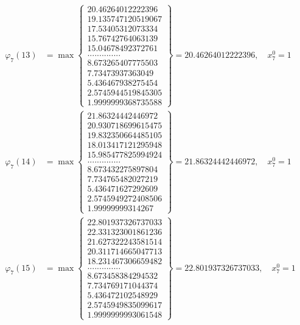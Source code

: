 \documentclass{article}
\begin{document}
\begin{align*}
  
  
  
\varphi_{7}(13) &= \max \left\{ \begin{array}{c}
20.46264012222396 \\
 19.135747120519067 \\
 17.53405312073334 \\
 15.76742764063139 \\
 15.04678492372761 \\
 .............. \\
 8.673265407775503 \\
 7.73473937363049 \\
 5.436467938275454 \\
 2.5745944519845305 \\
 1.9999999368735588
\end{array} \right\} = 20.46264012222396, \quad x_{7}^0 = 1\\
  
  
  
  
\varphi_{7}(14) &= \max \left\{ \begin{array}{c}
21.86324442446972 \\
 20.930718699615475 \\
 19.832350664485105 \\
 18.013417121295948 \\
 15.985477825994924 \\
 .............. \\
 8.673432275897804 \\
 7.734765482027219 \\
 5.436471627292609 \\
 2.5745949272408506 \\
 1.99999999314267
\end{array} \right\} = 21.86324442446972, \quad x_{7}^0 = 1\\
  
  
  
  
\varphi_{7}(15) &= \max \left\{ \begin{array}{c}
22.801937326737033 \\
 22.331323001861236 \\
 21.627322243581514 \\
 20.311714665047713 \\
 18.231467306659482 \\
 .............. \\
 8.673458384294532 \\
 7.734769171044374 \\
 5.436472102548929 \\
 2.5745949835099617 \\
 1.9999999993061548
\end{array} \right\} = 22.801937326737033, \quad x_{7}^0 = 1\\
  

\end{align*}
\end{document}
